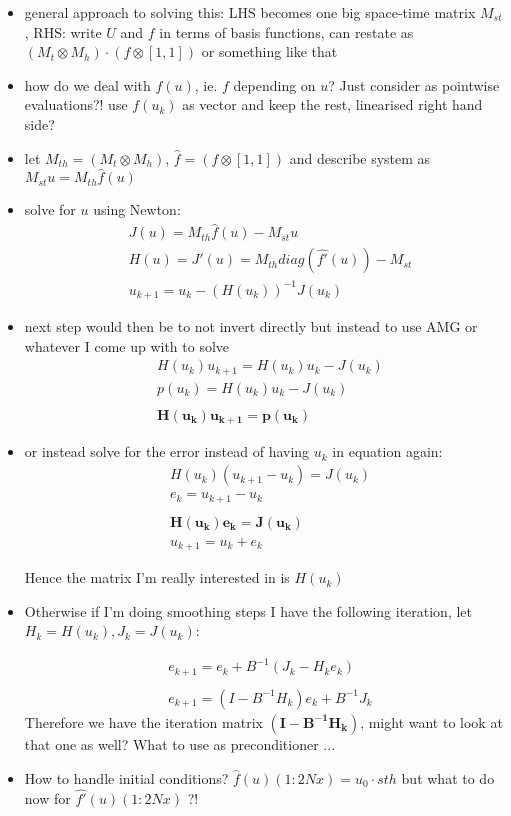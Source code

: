\documentclass[a4paper, 11pt]{article}
\begin{document}
\begin{itemize}
	\item general approach to solving this: LHS becomes one big space-time matrix $M_{st}$, RHS: write $U$ and $f$ in terms of basis functions, can restate as $(M_t \otimes M_h) \cdot (f \otimes [1, 1])$ or something like that
	\item how do we deal with $f(u)$, ie. $f$ depending on $u$? Just consider as pointwise evaluations?! use $f(u_k)$ as vector and keep the rest, linearised right hand side? 
	\item let $M_{th} = (M_t \otimes M_h)$, $ \hat{f} = (f \otimes [1, 1])$ and describe system as $M_{st} u =  M_{th} \hat{f}(u)$
	\item solve for $u$ using Newton: 
	\begin{align*}
	&J(u) = M_{th} \hat{f}(u) - M_{st} u \\
	&H(u) = J'(u) = M_{th} diag(\hat{f'}(u)) - M_{st} \\
	&u_{k+1} = u_k - (H(u_k))^{-1}J(u_k)
	\end{align*} 
	\item next step would then be to not invert directly but instead to use AMG or whatever I come up with to solve 
		\begin{align*}
	&H(u_k)u_{k+1} = H(u_k) u_k - J(u_k) \\
	&p (u_k) = H(u_k) u_k - J(u_k) \\
	\\
	&\mathbf{H(u_k)u_{k+1} = p (u_k)}
	\end{align*} 
	\item or instead solve for the error instead of having $u_k$ in equation again:
	\begin{align*}
	&H(u_k)(u_{k+1} - u_k) = J(u_k)	\\
	& e_{k} = u_{k+1}- u_k \\
	\\
	&\mathbf{H(u_k)e_{k} = J(u_k)} \\
	&u_{k+1} = u_k + e_{k}
	\end{align*} 
	
	Hence the matrix I'm really interested in is $H(u_k)$
	
	\item Otherwise if I'm doing smoothing steps I have the following iteration, let $H_k = H(u_k), J_k = J(u_k)$:
	
		\begin{align*}
	& e_{k+1} = e_k + B^{-1}(J_k - H_k e_k)	\\
	\\
	& e_{k+1} = (I - B^{-1}H_k) e_k + B^{-1}J_k
	\end{align*} 
	Therefore we have the iteration matrix $ \mathbf{(I - B^{-1}H_k)}$, might want to look at that one as well? What to use as preconditioner ... 
	
	\item How to handle initial conditions? $\hat{f}(u)(1:2Nx) = u_0 \cdot sth$ but what to do now for $\hat{f'}(u)(1:2Nx)$ ?!
	\end{itemize}
\end{document}
